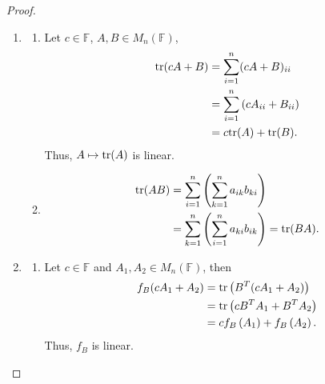 \documentclass[10pt]{book}
\theoremstyle{definition}
\numberwithin{equation}{chapter}
\begin{document}
\begin{proof}
~\begin{enumerate}[label=(\alph*)]
    \item \begin{enumerate}[label=\arabic*)]
        \item Let $c \in \mathbb{F}$, $A, B \in M_n(\mathbb{F})$, 
        \begin{align*}
            {\rm tr}(cA + B) & = \sum^n_{i=1} (cA + B)_{ii} \\
            & = \sum^n_{i=1} \left(cA_{ii} + B_{ii}\right) \\
            & = c {\rm tr}(A) + {\rm tr}(B).
        \end{align*}
        Thus, $A \mapsto {\rm tr}(A)$ is linear.
        
        \item 
        \begin{align*}
            {\rm tr}(AB) & = \sum^n_{i=1}\left(\sum^n_{k=1} a_{ik} b_{ki}\right) \\
            & = \sum^n_{k=1}\left(\sum^n_{i=1} a_{ki} b_{ik}\right) = {\rm tr}(BA).
        \end{align*}
    \end{enumerate}
    
    \item \begin{enumerate}[label=\arabic*)]
        \item Let $c \in \mathbb{F}$ and $A_1, A_2 \in  M_n(\mathbb{F})$, then
        \begin{align*}
            f_B(cA_1 + A_2) & = {\rm tr}\left(B^T (cA_1 + A_2)\right) \\
            & = {\rm tr}\left(c B^T A_1 + B^T A_2\right) \\
            & = c f_B\left(A_1\right) + f_B\left(A_2\right).
        \end{align*}
        Thus, $f_B$ is linear.
        

\end{enumerate}
\end{enumerate}
\end{proof}
\end{document}
